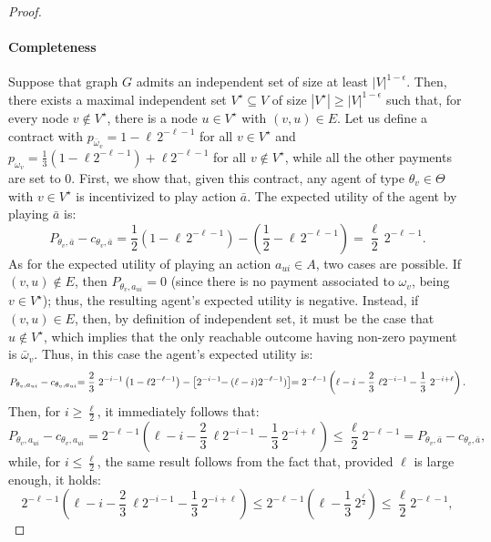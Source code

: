 \begin{proof}
	\paragraph{Completeness}
	Suppose that graph $G$ admits an independent set of size at least $|V|^{1-\epsilon}$.
	Then, there exists a maximal independent set $V^\star \subseteq V$ of size $|V^\star| \geq |V|^{1-\epsilon}$ such that, for every node $v \notin V^\star$, there is a node $u \in V^\star$ with $(v,u) \in E$.
	Let us define a contract with $p_{\bar \omega_v} = 1-\ell \, 2^{-\ell-1}$ for all $v \in V^\star$ and $p_{ \omega_v}=\frac{1}{3} \left( 1-\ell 2^{-\ell-1} \right)+\ell 2^{-\ell-1}$ for all $v  \notin V^\star$, while all the other payments are set to $0$.
	First, we show that, given this contract, any agent of type $\theta_v \in \Theta$ with $v \in V^\star$ is incentivized to play action $\bar a$.
	The expected utility of the agent by playing $\bar a$ is:
	\[
		P_{\theta_v,\bar a} - c_{\theta_v, \bar a} = \frac{1}{2} \left( 1-\ell \, 2^{-\ell-1} \right)- \left( \frac{1}{2}-\ell \, 2^{-\ell-1} \right)=\frac{\ell}{2}\, 2^{-\ell-1}.
	\]
	As for the expected utility of playing an action $a_{u i} \in A$, two cases are possible.
	If $(v,u) \notin E$, then $P_{\theta_v, a_{ui}} = 0$ (since there is no payment associated to $\omega_v$, being $v \in V^\star$); thus, the resulting agent's expected utility is negative.
	Instead, if $(v,u) \in E$, then, by definition of independent set, it must be the case that $u \notin V^\star$, which implies that the only reachable outcome having non-zero payment is $\bar \omega_v$. Thus, in this case the agent's expected utility is:
	\[
		P_{\theta_v,a_{ui}} - c_{\theta_v,  a_{ui}} \hspace{-1mm}=\frac{2}{3} \ 2^{-i-1}  \left( 1-\ell 2^{-\ell-1} \right) -\left[ 2^{-i-1}\hspace{-1mm}-(\ell-i)2^{-\ell-1}) \right]\hspace{-1mm}= 2^{-\ell-1} \left( \ell-i- \frac{2}{3} \ \ell2^{-i-1}- \frac{1}{3} \ 2^{-i+\ell} \right).
	\]
	Then, for $i \geq \frac{\ell}{2}$, it immediately follows that:
	\[
		P_{\theta_v,a_{ui}} - c_{\theta_v,  a_{ui}}  = 2^{-\ell-1} \left( \ell-i-\frac{2}{3}\ \ell2^{-i-1}-\frac{1}{3} \ 2^{-i+\ell} \right) \le \frac{\ell}{2}2^{-\ell-1} = P_{\theta_v,\bar a} - c_{\theta_v, \bar a},
	\]
	while, for $i \leq \frac{\ell}{2}$, the same result follows from the fact that, provided $\ell$ is large enough, it holds:
	\[
		2^{-\ell-1}\left( \ell-i-\frac{2}{3}\ \ell2^{-i-1}-\frac{1}{3} \ 2^{-i+\ell} \right) \le    2^{-\ell-1} \left( \ell - \frac{1}{3} \ 2^{\frac{\ell}{2}} \right)\le \frac{\ell}{2}2^{-\ell-1} ,
\]
\end{proof}

